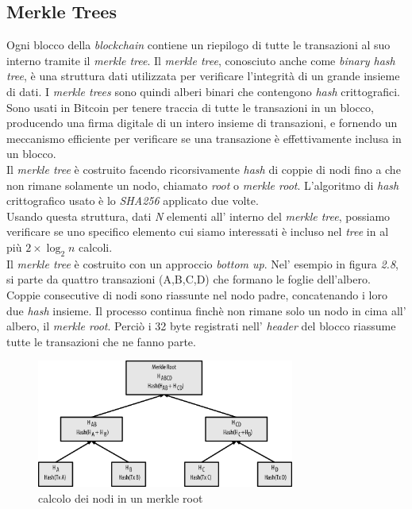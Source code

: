 \subsection{Merkle Trees}
Ogni blocco della \textit{blockchain} contiene un riepilogo di tutte le transazioni al suo interno tramite il \textit{merkle tree}. Il \textit{merkle tree}, conosciuto anche come \textit{binary hash tree}, \`e una struttura dati utilizzata per  verificare l'integrit\`a di un grande insieme di dati. I \textit{merkle trees} sono quindi alberi binari che contengono \textit{hash} crittografici.\\
Sono usati in Bitcoin per tenere traccia di tutte le transazioni in un blocco, producendo una firma digitale di un intero insieme di transazioni, e fornendo un meccanismo efficiente per verificare se una transazione \`e effettivamente inclusa in un blocco.\\
Il \textit{merkle tree} \`e costruito facendo ricorsivamente \textit{hash} di coppie di nodi fino a che non rimane solamente un nodo, chiamato \textit{root} o \textit{merkle root}. L'algoritmo di \textit{hash} crittografico usato \`e lo \textit{SHA256} applicato due volte.\\
Usando questa struttura, dati \textit{N} elementi all' interno del \textit{merkle tree}, possiamo verificare se uno specifico elemento cui siamo interessati \`e incluso nel \textit{tree} in al pi\`u $2\times\log_2{n}$ calcoli.\\
Il \textit{merkle tree} \`e costruito con un approccio \textit{bottom up}. Nel' esempio in figura \textit{2.8}, si parte da quattro transazioni (A,B,C,D) che formano le foglie dell'albero. Coppie consecutive di nodi sono riassunte nel nodo padre, concatenando i loro due \textit{hash} insieme. Il processo continua finch\`e non rimane solo un nodo in cima all' albero, il \textit{merkle root}. Perci\`o i 32 byte registrati nell' \textit{header} del blocco riassume tutte le transazioni che ne fanno parte.
\begin{figure}[htb]
\begin{center}
   \includegraphics[width=0.755\textwidth]{imgs/merkleTree.png}
   \caption{calcolo dei nodi in un merkle root}
   \end{center}
   \hfill
\end{figure}
